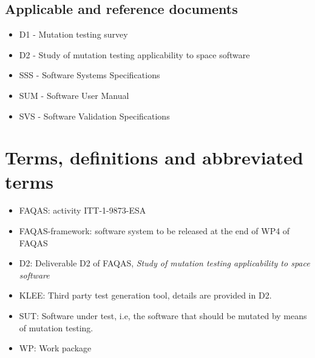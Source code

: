 \section{Applicable and reference documents}

\begin{itemize}
\item{D1 - Mutation testing survey}
\item{D2 - Study of mutation testing applicability to space software}
\item{SSS - Software Systems Specifications}
\item{SUM - Software User Manual}
\item{SVS - Software Validation Specifications}
\end{itemize}

\chapter{Terms, definitions and abbreviated terms}

\begin{itemize}
\item{FAQAS}: activity ITT-1-9873-ESA
\item{FAQAS-framework}: software system to be released at the end of WP4 of FAQAS
\item{D2}: Deliverable D2 of FAQAS, \emph{Study of mutation testing applicability to space software}
\item{KLEE}: Third party test generation tool, details are provided in D2.
\item{SUT}: Software under test, i.e, the software that should be mutated by means of mutation testing.
\item{WP}: Work package
\end{itemize}

\clearpage
 

